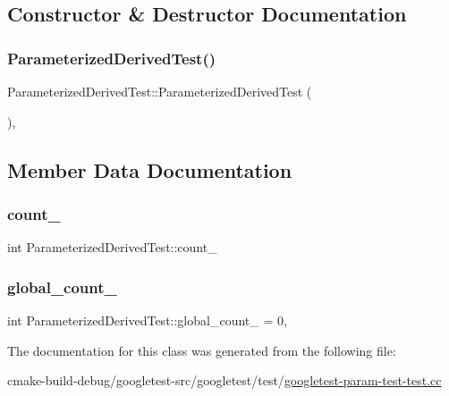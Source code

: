 \subsection{Constructor \& Destructor Documentation}
\mbox{\label{classParameterizedDerivedTest_a5fb176948a078a3754df7b9939568c78}} 
\subsubsection{\texorpdfstring{ParameterizedDerivedTest()}{ParameterizedDerivedTest()}}
{\footnotesize\ttfamily Parameterized\+Derived\+Test\+::\+Parameterized\+Derived\+Test (\begin{DoxyParamCaption}{ }\end{DoxyParamCaption})\hspace{0.3cm}{\ttfamily [inline]}, {\ttfamily [protected]}}



\subsection{Member Data Documentation}
\mbox{\label{classParameterizedDerivedTest_ad8a2968265e7477c13585d17bbd0492c}} 
\subsubsection{\texorpdfstring{count\_}{count\_}}
{\footnotesize\ttfamily int Parameterized\+Derived\+Test\+::count\+\_\+\hspace{0.3cm}{\ttfamily [protected]}}

\mbox{\label{classParameterizedDerivedTest_ab6c067a099764a9d58b5f2e8ebcb5d0f}} 
\subsubsection{\texorpdfstring{global\_count\_}{global\_count\_}}
{\footnotesize\ttfamily int Parameterized\+Derived\+Test\+::global\+\_\+count\+\_\+ = 0\hspace{0.3cm}{\ttfamily [static]}, {\ttfamily [protected]}}



The documentation for this class was generated from the following file\+:\begin{DoxyCompactItemize}
\item 
cmake-\/build-\/debug/googletest-\/src/googletest/test/\mbox{\hyperlink{googletest-param-test-test_8cc}{googletest-\/param-\/test-\/test.\+cc}}\end{DoxyCompactItemize}
